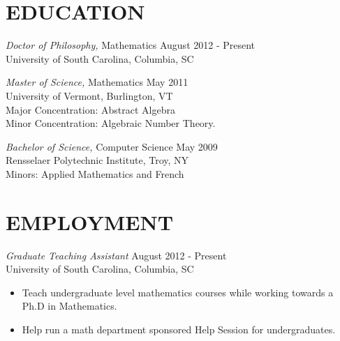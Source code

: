 \documentclass[line,overlapped]{res}
\begin{document}
\address{2420 Monroe Street}
\address{Columbia, SC 29205}

\begin{resume}
  
  
  \section{EDUCATION} 
          {\sl Doctor of Philosophy,} Mathematics \hfill August 2012 - Present\\
          University of South Carolina, Columbia, SC

          {\sl Master of Science,} Mathematics \hfill May 2011\\
          University of Vermont, Burlington, VT\\
          Major Concentration: Abstract Algebra\\
          Minor Concentration: Algebraic Number Theory.

          {\sl Bachelor of Science,} Computer Science \hfill May 2009\\
          Rensselaer Polytechnic Institute, Troy, NY\\
          Minors: Applied Mathematics and French

          \section{EMPLOYMENT}
                  {\sl Graduate Teaching Assistant} \hfill August 2012 - Present \\
                  University of South Carolina, Columbia, SC
                  \begin{itemize}  \itemsep -2pt %
                  \item
                    Teach undergraduate level mathematics courses while working towards a Ph.D in Mathematics.
                  \item 
                    Help run a math department sponsored Help Session for undergraduates.
                  \end{itemize}
                  

\end{resume}
\end{document}

